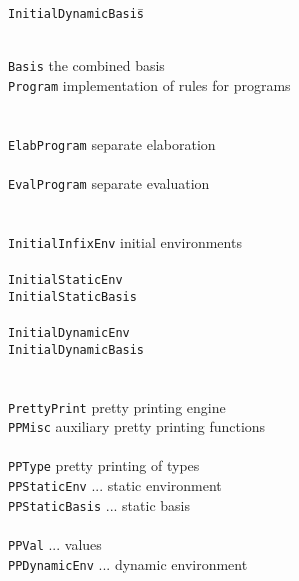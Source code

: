 \documentclass[twoside,titlepage]{article}
\begin{document}
\begin{quoting}
\begin{tabbing}
{\tt InitialDynamicBasis}\qquad\= \kill

\hspace{-1em}{\tt exec/} \\
{\tt Basis}			\> the combined basis \\
{\tt Program}			\> implementation of rules for programs \\
\\
\hspace{-1em}{\tt elab/} \\
{\tt ElabProgram}		\> separate elaboration \\
\hspace{-1em}{\tt eval/} \\
{\tt EvalProgram}		\> separate evaluation \\
\\
\hspace{-1em}{\tt parse/} \\
{\tt InitialInfixEnv}		\> initial environments \\
\hspace{-1em}{\tt elab/} \\
{\tt InitialStaticEnv}		\> \\
{\tt InitialStaticBasis}	\> \\
\hspace{-1em}{\tt eval/} \\
{\tt InitialDynamicEnv}		\> \\
{\tt InitialDynamicBasis}	\> \\
\\
\hspace{-1em}{\tt infrastruture/} \\
{\tt PrettyPrint}		\> pretty printing engine \\
{\tt PPMisc}			\> auxiliary pretty printing functions \\
\hspace{-1em}{\tt elab/} \\
{\tt PPType}			\> pretty printing of types \\
{\tt PPStaticEnv}		\> ... static environment \\
{\tt PPStaticBasis}		\> ... static basis \\
\hspace{-1em}{\tt eval/} \\
{\tt PPVal}			\> ... values \\
{\tt PPDynamicEnv}		\> ... dynamic environment \\

\end{tabbing}
\end{quoting}
\end{document}
